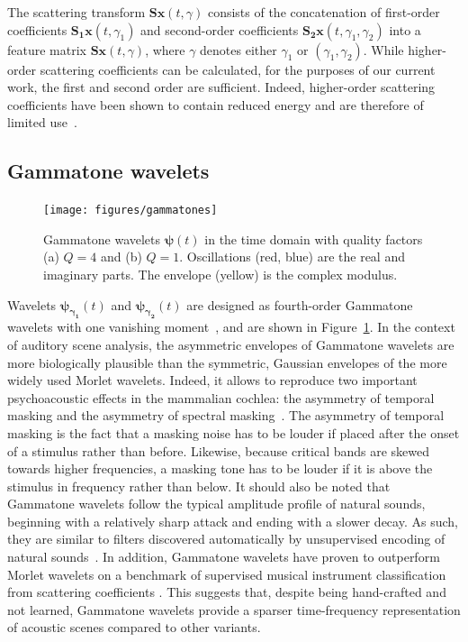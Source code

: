 \documentclass[smallextended]{svjour3}
\begin{document}
The scattering transform $\mathbf{S}\boldsymbol{x}(t,\gamma)$ consists of the concatenation of first-order coefficients $\mathbf{S_1}\boldsymbol{x}(t,\gamma_1)$ and second-order coefficients $\mathbf{S_2}\boldsymbol{x}(t,\gamma_1,\gamma_2)$ into a feature matrix $\mathbf{S}\boldsymbol{x}(t,\gamma)$, where $\gamma$ denotes either $\gamma_1$ or $(\gamma_1,\gamma_2)$. While higher-order scattering coefficients can be calculated, for the purposes of our current work, the first and second order are sufficient.
Indeed, higher-order scattering coefficients have been shown to contain reduced energy and are therefore of limited use~\cite{irene}.

\subsection{Gammatone wavelets}
\begin{figure}
\begin{center}
\texttt{[image: figures/gammatones]}
\caption{
\label{fig:gammatones}
Gammatone wavelets $\boldsymbol{\psi}(t)$ in the time domain with quality factors (a) $Q = 4$ and (b) $Q = 1$.
Oscillations (red, blue) are the real and imaginary parts. The envelope (yellow) is the complex modulus.}
\end{center}
\end{figure}
Wavelets
$\boldsymbol{\psi_{\gamma_1}}(t)$ and $\boldsymbol{\psi_{\gamma_2}}(t)$ are designed as fourth-order Gammatone
wavelets with one vanishing moment~\cite{Venkitaraman2014}, and are shown in Figure~\ref{fig:gammatones}.
In the context of auditory scene analysis, the asymmetric envelopes of Gammatone wavelets are more biologically plausible than the symmetric, Gaussian envelopes of the more widely used Morlet wavelets.
Indeed, it allows to reproduce two important psychoacoustic effects in the mammalian cochlea: the asymmetry of temporal masking and the asymmetry of spectral masking~\cite{Fastl2007}.
The asymmetry of temporal masking is the fact that a masking noise has to be louder if placed after the onset of a stimulus rather than before.
Likewise, because critical bands are skewed towards higher frequencies, a masking tone has to be louder if it is above the stimulus in frequency rather than below.
It should also be noted that Gammatone wavelets follow the typical amplitude profile of natural sounds, beginning with a relatively sharp attack and ending with a slower decay.
As such, they are similar to filters discovered automatically by unsupervised encoding of natural sounds~\cite{Smith2006,sainath2015interspeech}.
In addition, Gammatone wavelets have proven to outperform Morlet wavelets on a benchmark of supervised musical instrument classification from scattering coefficients \cite{lostanlen2017phd}.
This suggests that, despite being hand-crafted and not learned, Gammatone wavelets provide a sparser time-frequency representation of acoustic scenes compared to other variants.
\end{document}
